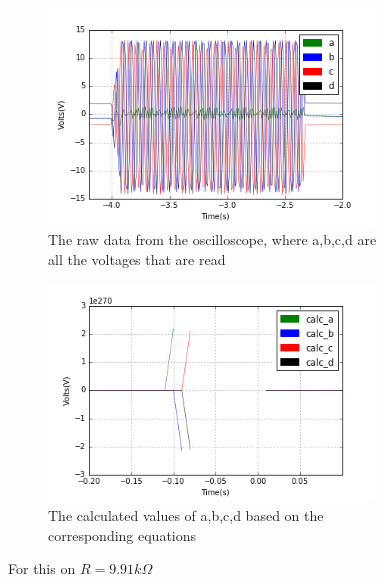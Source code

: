 \begin{figure}[h!]
\centering
\begin{subfigure}[t]{.475\textwidth}
  \centering
  \includegraphics[width=0.95\textwidth, height=0.25\textheight]{figures/DHO/scope_36raw.png}
  \caption{The raw data from the oscilloscope, where a,b,c,d are all the voltages that are read}
 \label{fig:sum_7_og_data}
\end{subfigure}\hfill
\begin{subfigure}[t]{.475\textwidth}
  \centering
  \includegraphics[width=0.95\textwidth, height=0.25\textheight]{figures/DHO/scope_36calc.png}
  \caption{The calculated values of a,b,c,d based on the corresponding equations}
\label{fig:sum_7_calc_data}
\end{subfigure}
\caption{For this on $R = 9.91k\Omega$}
\label{fig:sum_7}
\end{figure}


